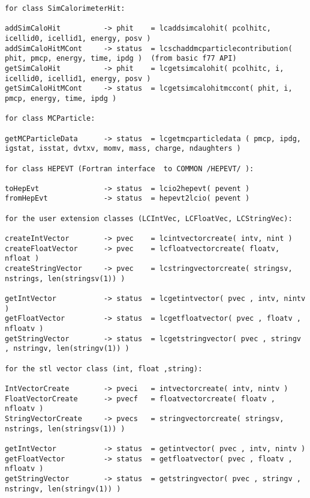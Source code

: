 \begin{scriptsize}
\begin{verbatim}
for class SimCalorimeterHit:

addSimCaloHit          -> phit    = lcaddsimcalohit( pcolhitc, icellid0, icellid1, energy, posv )
addSimCaloHitMCont     -> status  = lcschaddmcparticlecontribution( phit, pmcp, energy, time, ipdg )  (from basic f77 API)
getSimCaloHit          -> phit    = lcgetsimcalohit( pcolhitc, i, icellid0, icellid1, energy, posv )
getSimCaloHitMCont     -> status  = lcgetsimcalohitmccont( phit, i, pmcp, energy, time, ipdg )

for class MCParticle:

getMCParticleData      -> status  = lcgetmcparticledata ( pmcp, ipdg, igstat, isstat, dvtxv, momv, mass, charge, ndaughters )

for class HEPEVT (Fortran interface  to COMMON /HEPEVT/ ):

toHepEvt               -> status  = lcio2hepevt( pevent )
fromHepEvt             -> status  = hepevt2lcio( pevent )

for the user extension classes (LCIntVec, LCFloatVec, LCStringVec):

createIntVector        -> pvec    = lcintvectorcreate( intv, nint )
createFloatVector      -> pvec    = lcfloatvectorcreate( floatv, nfloat )
createStringVector     -> pvec    = lcstringvectorcreate( stringsv, nstrings, len(stringsv(1)) )

getIntVector           -> status  = lcgetintvector( pvec , intv, nintv )
getFloatVector         -> status  = lcgetfloatvector( pvec , floatv , nfloatv )
getStringVector        -> status  = lcgetstringvector( pvec , stringv , nstringv, len(stringv(1)) )

for the stl vector class (int, float ,string):

IntVectorCreate        -> pveci   = intvectorcreate( intv, nintv )
FloatVectorCreate      -> pvecf   = floatvectorcreate( floatv , nfloatv )
StringVectorCreate     -> pvecs   = stringvectorcreate( stringsv, nstrings, len(stringsv(1)) )

getIntVector           -> status  = getintvector( pvec , intv, nintv )
getFloatVector         -> status  = getfloatvector( pvec , floatv , nfloatv )
getStringVector        -> status  = getstringvector( pvec , stringv , nstringv, len(stringv(1)) )
\end{verbatim}

\end{scriptsize}


